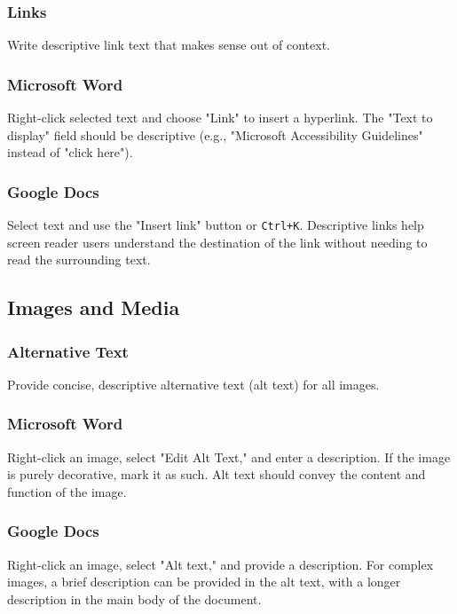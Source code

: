 \subsubsection{Links}\label{ch15:sssec:links}
Write descriptive link text that makes sense out of context.

\subsubsection{Microsoft Word}\label{ch15:sssec:word-links}
Right-click selected text and choose "Link" to insert a hyperlink. The "Text to display" field should be descriptive (e.g., "Microsoft Accessibility Guidelines" instead of "click here").

\subsubsection{Google Docs}\label{ch15:sssec:docs-links}
Select text and use the "Insert link" button or \texttt{Ctrl+K}. Descriptive links help screen reader users understand the destination of the link without needing to read the surrounding text.

\subsection{Images and Media}\label{ch15:ssec:images-media}

\subsubsection{Alternative Text}\label{ch15:sssec:alt-text}
Provide concise, descriptive alternative text (alt text) for all images.

\subsubsection{Microsoft Word}\label{ch15:sssec:word-alt-text}
Right-click an image, select "Edit Alt Text," and enter a description. If the image is purely decorative, mark it as such. Alt text should convey the content and function of the image.

\subsubsection{Google Docs}\label{ch15:sssec:docs-alt-text}
Right-click an image, select "Alt text," and provide a description. For complex images, a brief description can be provided in the alt text, with a longer description in the main body of the document.

